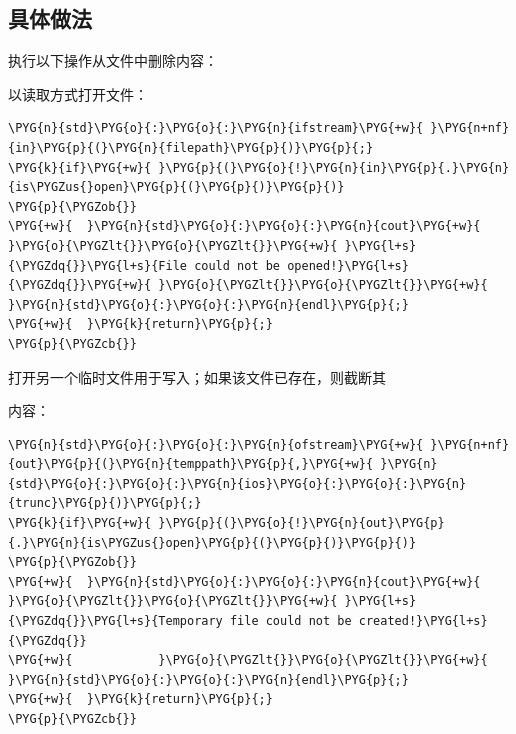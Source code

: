 
\subsection{具体做法}



执行以下操作从文件中删除内容：



以读取方式打开文件：



\begin{codeblockbg}
\begin{Verbatim}[commandchars=\\\{\},breaklines=true,breakanywhere=true,fontsize=\codefont,xleftmargin=17bp]
\PYG{n}{std}\PYG{o}{:}\PYG{o}{:}\PYG{n}{ifstream}\PYG{+w}{ }\PYG{n+nf}{in}\PYG{p}{(}\PYG{n}{filepath}\PYG{p}{)}\PYG{p}{;}
\PYG{k}{if}\PYG{+w}{ }\PYG{p}{(}\PYG{o}{!}\PYG{n}{in}\PYG{p}{.}\PYG{n}{is\PYGZus{}open}\PYG{p}{(}\PYG{p}{)}\PYG{p}{)}
\PYG{p}{\PYGZob{}}
\PYG{+w}{  }\PYG{n}{std}\PYG{o}{:}\PYG{o}{:}\PYG{n}{cout}\PYG{+w}{ }\PYG{o}{\PYGZlt{}}\PYG{o}{\PYGZlt{}}\PYG{+w}{ }\PYG{l+s}{\PYGZdq{}}\PYG{l+s}{File could not be opened!}\PYG{l+s}{\PYGZdq{}}\PYG{+w}{ }\PYG{o}{\PYGZlt{}}\PYG{o}{\PYGZlt{}}\PYG{+w}{ }\PYG{n}{std}\PYG{o}{:}\PYG{o}{:}\PYG{n}{endl}\PYG{p}{;}
\PYG{+w}{  }\PYG{k}{return}\PYG{p}{;}
\PYG{p}{\PYGZcb{}}
\end{Verbatim}
\end{codeblockbg}



打开另一个临时文件用于写入；如果该文件已存在，则截断其



内容：



\begin{codeblockbg}
\begin{Verbatim}[commandchars=\\\{\},breaklines=true,breakanywhere=true,fontsize=\codefont,xleftmargin=17bp]
\PYG{n}{std}\PYG{o}{:}\PYG{o}{:}\PYG{n}{ofstream}\PYG{+w}{ }\PYG{n+nf}{out}\PYG{p}{(}\PYG{n}{temppath}\PYG{p}{,}\PYG{+w}{ }\PYG{n}{std}\PYG{o}{:}\PYG{o}{:}\PYG{n}{ios}\PYG{o}{:}\PYG{o}{:}\PYG{n}{trunc}\PYG{p}{)}\PYG{p}{;}
\PYG{k}{if}\PYG{+w}{ }\PYG{p}{(}\PYG{o}{!}\PYG{n}{out}\PYG{p}{.}\PYG{n}{is\PYGZus{}open}\PYG{p}{(}\PYG{p}{)}\PYG{p}{)}
\PYG{p}{\PYGZob{}}
\PYG{+w}{  }\PYG{n}{std}\PYG{o}{:}\PYG{o}{:}\PYG{n}{cout}\PYG{+w}{ }\PYG{o}{\PYGZlt{}}\PYG{o}{\PYGZlt{}}\PYG{+w}{ }\PYG{l+s}{\PYGZdq{}}\PYG{l+s}{Temporary file could not be created!}\PYG{l+s}{\PYGZdq{}}
\PYG{+w}{            }\PYG{o}{\PYGZlt{}}\PYG{o}{\PYGZlt{}}\PYG{+w}{ }\PYG{n}{std}\PYG{o}{:}\PYG{o}{:}\PYG{n}{endl}\PYG{p}{;}
\PYG{+w}{  }\PYG{k}{return}\PYG{p}{;}
\PYG{p}{\PYGZcb{}}
\end{Verbatim}
\end{codeblockbg}


